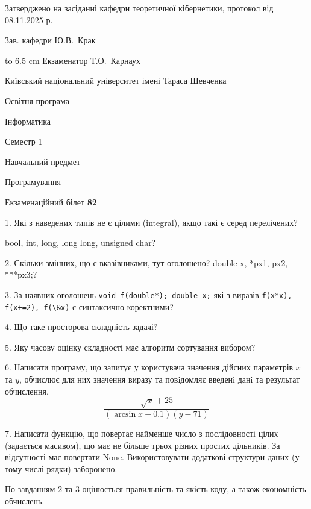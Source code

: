 \documentclass[12pt, ukrainian]{article}
\def\code#1{\Verb!#1!}
\begin{document}
{\smallskip\smallskip \begin {scriptsize} Затверджено на засіданні кафедри теоретичної кібернетики, протокол   від   08.11.2025 р.\par\smallskip\smallskip\smallskip\smallskip
{\parbox {6.5 cm} {Зав. кафедри \dotfill Ю.В.~Крак}}\hspace {0.7cm} {\hbox to 6.5 cm { Екзаменатор \dotfill Т.О.~Карнаух}} \end{scriptsize}}
\vspace{0.9cm}
{{\begin {scriptsize}\par
{ \center  Київський національний університет імені Тараса Шевченка \par}
{\parbox {5 cm}{Освітня програма \hfill}{\parbox {7 cm}{Інформатика\hfill}}\parbox {6 cm}{\hfill Семестр 1}}\par
{\parbox {5 cm} {Навчальний предмет \hfill}\parbox {7 cm}{Програмування \hfill}\parbox {6cm}{\hfill}\par}\vspace{-15pt} \end{scriptsize}}{\center Екзаменаційний білет \No \textbf { 82 }\par}}
{%
1. Які з наведених типів не є цілими (integral), якщо такі є серед перелічених?

bool, int, long, long long, unsigned char?
\par
\vspace{2mm}
2. Скільки змінних, що є вказівниками, тут оголошено?
double x, *px1, px2, ***px3;?
\par
\vspace{2mm}
3. За наявних оголошень \code{void f(double*); double x;} які з виразів \code{f(x*x), f(x+=2), f(\&x)} є синтаксично коректними?
\par
\vspace{2mm}
4. Що таке просторова складність задачі?
\par
\vspace{2mm}
5. Яку часову оцінку складності має алгоритм сортування вибором?
\par
\vspace{2mm}
6. Написати програму, що запитує у користувача значення дійсних параметрів $x$ та $y$, обчислює для них значення виразу та повiдомляє введенi данi та результат обчислення.
$$\frac{\sqrt x + 25}{(\arcsin x - 0.1) (y - 71)}$$ 

\par
7. Написати функцію, що повертає найменше число з послідовності цілих (задається масивом), що має не більше трьох різних простих дільників. За відсутності має повертати None. Використовувати додаткові структури даних (у тому числі рядки) заборонено.

По завданням 2 та 3 оцінюється правильність та якість коду, а також економність обчислень.

}
\end{document}
